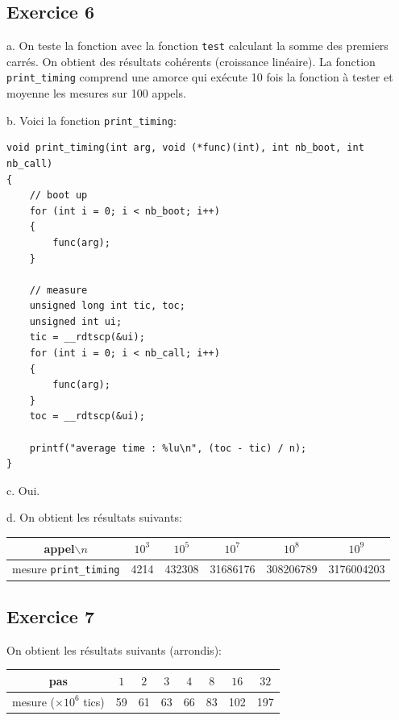 \documentclass[11pt, a4 paper]{article}
\begin{document}
\subsection{Exercice 6}
a. On teste la fonction avec la fonction \texttt{test} calculant la somme des premiers carrés. On obtient des résultats cohérents (croissance linéaire). La fonction \texttt{print\_timing} comprend une amorce qui exécute 10 fois la fonction à tester et moyenne les mesures sur 100 appels.

b. Voici la fonction \texttt{print\_timing}:

\begin{lstlisting}[style=CStyle]
void print_timing(int arg, void (*func)(int), int nb_boot, int nb_call)
{
    // boot up
    for (int i = 0; i < nb_boot; i++)
    {
        func(arg);
    }

    // measure
    unsigned long int tic, toc;
    unsigned int ui;
    tic = __rdtscp(&ui);
    for (int i = 0; i < nb_call; i++)
    {
        func(arg);
    }
    toc = __rdtscp(&ui);

    printf("average time : %lu\n", (toc - tic) / n);
}
\end{lstlisting}

c. Oui.

d. On obtient les résultats suivants:
\begin{center}
    \begin{tabular}{| c | c | c | c | c | c |}
        \hline
    appel$\backslash n$ & $10^3$ & $10^5$ & $10^7$ & $10^8$ & $10^9$ \\
        \hline
        mesure \texttt{print\_timing} & 4214 & 432308 & 31686176 & 308206789 & 3176004203\\ 
        \hline
    \end{tabular}
\end{center}

\subsection{Exercice 7}
On obtient les résultats suivants (arrondis):
\begin{center}
    \begin{tabular}{| c | c | c | c | c | c | c | c |}
        \hline
        pas & $1$ & $2$ & $3$ & $4$ & $8$ & $16$ & $32$ \\
        \hline
        mesure ($\times 10^6$ tics)& 59 & 61 & 63 & 66 & 83 & 102 & 197 \\ 
        \hline
    \end{tabular}
\end{center}
\end{document}

